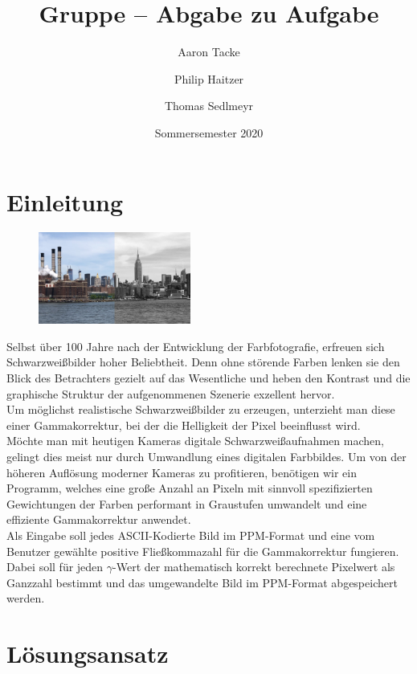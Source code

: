 \documentclass[course=erap]{aspdoc}
\author{Aaron Tacke \and Philip Haitzer \and Thomas Sedlmeyr}
\date{Sommersemester 2020} %
\title{Gruppe \theGroup{} -- Abgabe zu Aufgabe \theNumber}
\begin{document}
	\maketitle
	
	\section{Einleitung}
	
	\begin{figure}
		\includegraphics[width=5cm]{Images/gammaBeispiel.jpg}
	\end{figure}
	Selbst über 100 Jahre nach der Entwicklung der Farbfotografie, erfreuen sich Schwarzweißbilder hoher Beliebtheit. Denn ohne störende Farben lenken sie den Blick des Betrachters gezielt auf das Wesentliche und heben den Kontrast und die graphische Struktur der aufgenommenen Szenerie exzellent hervor.\\
	Um möglichst realistische Schwarzweißbilder zu erzeugen, unterzieht man diese einer Gammakorrektur, bei der die Helligkeit der Pixel beeinflusst wird.\\
	
	\noindent Möchte man mit heutigen Kameras digitale Schwarzweißaufnahmen machen, gelingt dies meist nur durch Umwandlung eines digitalen Farbbildes. Um von der höheren Auflösung moderner Kameras zu profitieren, benötigen wir ein Programm, welches eine große Anzahl an Pixeln mit sinnvoll spezifizierten Gewichtungen der Farben performant in Graustufen umwandelt und eine effiziente Gammakorrektur anwendet.\\
	
	\noindent Als Eingabe soll jedes ASCII-Kodierte Bild im PPM-Format und eine vom Benutzer gewählte positive Fließkommazahl für die Gammakorrektur fungieren. Dabei soll für jeden $\gamma$-Wert der mathematisch korrekt berechnete Pixelwert als Ganzzahl bestimmt und das umgewandelte Bild im PPM-Format abgespeichert werden.
	
	
	\section{Lösungsansatz}
\end{document}
